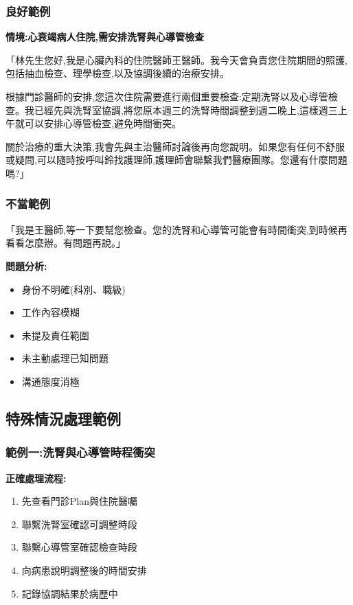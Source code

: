 \documentclass[12pt,a4paper]{article}
\begin{document}
\subsubsection{良好範例}
\textbf{情境:心衰竭病人住院,需安排洗腎與心導管檢查}

\begin{tcolorbox}[
    colback=emergency_blue!5!white,
    colframe=emergency_blue,
    title=\textbf{良好的自我介紹範例},
    fonttitle=\bfseries
]
「林先生您好,我是心臟內科的住院醫師王醫師。我今天會負責您住院期間的照護,包括抽血檢查、理學檢查,以及協調後續的治療安排。

根據門診醫師的安排,您這次住院需要進行兩個重要檢查:定期洗腎以及心導管檢查。我已經先與洗腎室協調,將您原本週三的洗腎時間調整到週二晚上,這樣週三上午就可以安排心導管檢查,避免時間衝突。

關於治療的重大決策,我會先與主治醫師討論後再向您說明。如果您有任何不舒服或疑問,可以隨時按呼叫鈴找護理師,護理師會聯繫我們醫療團隊。您還有什麼問題嗎?」
\end{tcolorbox}

\subsubsection{不當範例}
\begin{tcolorbox}[
    colback=emergency_red!5!white,
    colframe=emergency_red,
    title=\textbf{不當的自我介紹範例},
    fonttitle=\bfseries
]
「我是王醫師,等一下要幫您檢查。您的洗腎和心導管可能會有時間衝突,到時候再看看怎麼辦。有問題再說。」

\textbf{問題分析:}
\begin{itemize}[nosep]
    \item 身份不明確(科別、職級)
    \item 工作內容模糊
    \item 未提及責任範圍
    \item 未主動處理已知問題
    \item 溝通態度消極
\end{itemize}
\end{tcolorbox}

\subsection{特殊情況處理範例}

\subsubsection{範例一:洗腎與心導管時程衝突}
\textbf{正確處理流程:}
\begin{enumerate}[nosep]
    \item 先查看門診Plan與住院醫囑
    \item 聯繫洗腎室確認可調整時段
    \item 聯繫心導管室確認檢查時段
    \item 向病患說明調整後的時間安排
    \item 記錄協調結果於病歷中
\end{enumerate}
\end{document}
